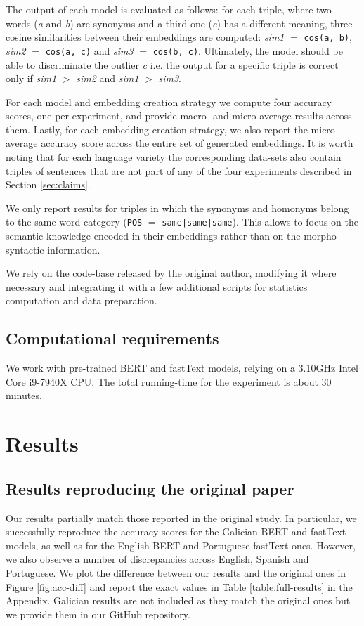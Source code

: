 The output of each model is evaluated as follows: for each triple, where two words (\textit{a} and \textit{b}) are synonyms and a third one (\textit{c}) has a different meaning, three cosine similarities between their embeddings are computed: \textit{sim1} $=$ \texttt{cos(a, b)}, \textit{sim2} $=$ \texttt{cos(a, c)} and \textit{sim3} $=$ \texttt{cos(b, c)}. Ultimately, the model should be able to discriminate the outlier \textit{c} i.e. the output for a specific triple is correct only if \textit{sim1} $>$ \textit{sim2} and \textit{sim1} $>$ \textit{sim3}.

For each model and embedding creation strategy we compute four accuracy scores, one per experiment, and provide macro- and micro-average results across them. Lastly, for each embedding creation strategy, we also report the micro-average accuracy score across the entire set of generated embeddings. It is worth noting that for each language variety the corresponding data-sets also contain triples of sentences that are not part of any of the four experiments described in Section \ref{sec:claims}.

We only report results for triples in which the synonyms and homonyms belong to the same word category (\texttt{POS} $=$ \texttt{same|same|same}). This allows to focus on the semantic knowledge encoded in their embeddings rather than on the morpho-syntactic information.

We rely on the code-base released by the original author, modifying it where necessary and integrating it with a few additional scripts for statistics computation and data preparation.

\subsection{Computational requirements}
We work with pre-trained BERT and fastText models, relying on a 3.10GHz Intel Core i9-7940X CPU. The total running-time for the experiment is about 30 minutes.

\section{Results}
\label{sec:results}

\subsection{Results reproducing the original paper}
Our results partially match those reported in the original study. In particular, we successfully reproduce the accuracy scores for the Galician BERT and fastText models, as well as for the English BERT and Portuguese fastText ones. However, we also observe a number of discrepancies across English, Spanish and Portuguese. We plot the difference between our results and the original ones in Figure \ref{fig:acc-diff} and report the exact values in Table \ref{table:full-results} in the Appendix. Galician results are not included as they match the original ones but we provide them in our GitHub repository.

